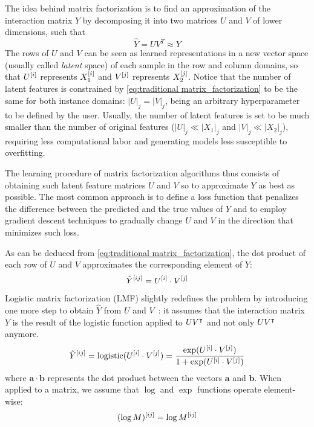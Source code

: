The idea behind matrix factorization is to find an approximation of the interaction matrix $Y$ by decomposing it into two matrices $U$ and $V$ of lower dimensions, such that %
%
\begin{equation}
    \hat Y = U V^T \approx Y
    \label{eq:traditional matrix_factorization}
\end{equation}
%
The rows of $U$ and $V$ can be seen as learned representations in a new vector space (usually called \emph{latent} space) of each sample in the row and column domains, so that $U^{[i]}$ represents $X_1^{[i]}$ and $V^{[j]}$ represents $X_2^{[j]}$.
%
Notice that the number of latent features is constrained by \autoref{eq:traditional matrix_factorization} to be the same for both instance domains: $|U|_j=|V|_j$, being an arbitrary hyperparameter to be defined by the user. Usually, the number of latent features is set to be much smaller than the number of original features ($|U|_j \ll |X_1|_j$ and $|V|_j \ll |X_2|_j$), requiring less computational labor and generating models less susceptible to overfitting.

The learning procedure of matrix factorization algorithms thus consists of obtaining such latent feature matrices $U$ and $V$ so to approximate $Y$ as best as possible. The most common approach is to define a loss function that penalizes the difference between the predicted and the true values of $Y$ and to employ gradient descent techniques to gradually change $U$ and $V$ in the direction that minimizes such loss.
%

As can be deduced from \autoref{eq:traditional matrix_factorization}, the dot product of each row of $U$ and $V$ approximates the corresponding element of $Y$:
%
\begin{equation}
    \hat Y^{[ij]} = U^{[i]} \cdot V^{[j]}
\end{equation}
%
Logistic matrix factorization (LMF) slightly redefines the problem by introducing one more step to obtain $\hat Y$ from $U$ and $V$~\cite{johnsonlogistic}: it assumes that the interaction matrix $Y$ is the result of the logistic function applied to $UV^\intercal$ and not only $UV^\intercal$ anymore.
%
\begin{equation}
    \hat Y^{[ij]} = \text{logistic}(U^{[i]} \cdot V^{[j]})
    = \frac{\exp(U^{[i]} \cdot V^{[j]})}{1 + \exp(U^{[i]} \cdot V^{[j]})}
    \label{eq:lmf_prediction}
\end{equation}
%
where $\mathbf{a} \cdot \mathbf{b}$ represents the dot product between the vectors $\mathbf{a}$ and $\mathbf{b}$. When applied to a matrix, we assume that $\log$ and $\exp$ functions operate element-wise:
%
\begin{equation*}
    (\log M)^{[ij]} = \log M^{[ij]}
\end{equation*}

